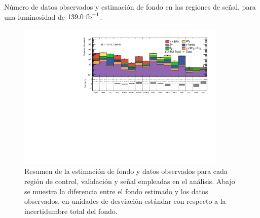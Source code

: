 \begin{table}[ht!]
  \centering
  \caption{Número de datos observados y estimación de fondo en las regiones de señal, para una luminosidad de $139.0\ \text{fb}^{-1}$.}
  
  \label{tab:fit_result_sr_unblinded}
\end{table}

\begin{figure}[ht!]
  \centering
  \includegraphics[width=0.89\textwidth]{images/results/fr2_unblind/regions_pull_significance.pdf}
  \caption{Resumen de la estimación de fondo y datos observados para cada región de control, validación y señal empleadas en el análisis. Abajo se muestra la diferencia entre el fondo estimado y los datos observados, en unidades de desviación estándar con respecto a la incertidumbre total del fondo.}
  \label{fig:regions_pulls_unblinded}
\end{figure}


